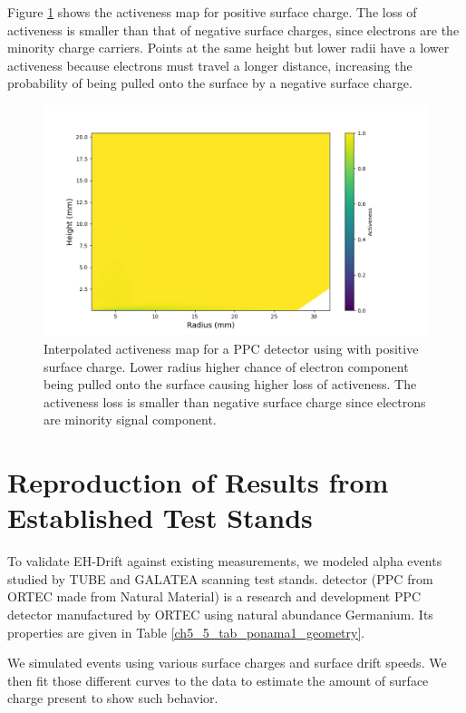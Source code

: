 Figure \ref{ch5_fig_interpolated_activeness_map_pos} shows the activeness map for positive surface charge. The loss of activeness is smaller than that of negative surface charges, since electrons are the minority charge carriers. Points at the same height but lower radii have a lower activeness because electrons must travel a longer distance, increasing the probability of being pulled onto the surface by a negative surface charge.

\begin{figure}%
\centering
\includegraphics[trim={1.5cm 0cm 3.3cm 1cm},clip,width=0.9\linewidth]{ch5/figs/activeness_map_cubic_sc=0.3_ponama_1_5000.png}
\caption{Interpolated activeness map for a PPC detector using \ehd with positive surface charge. Lower radius higher chance of electron component being pulled onto the surface causing higher loss of activeness. The activeness loss is smaller than negative surface charge since electrons are minority signal component.}
\label{ch5_fig_interpolated_activeness_map_pos}
\end{figure}


\section{\label{res:1} Reproduction of Results from Established Test Stands}

To validate EH-Drift against existing measurements, we modeled alpha events studied by TUBE and GALATEA scanning test stands. {\ponama} detector (PPC from ORTEC made from Natural Material) is a research and development PPC detector manufactured by ORTEC using natural abundance Germanium. Its properties are given in Table \ref{ch5_5_tab_ponama1_geometry}.



We simulated events using various surface charges and surface drift speeds.  We then fit those different curves to the data to estimate the amount of surface charge present to show such behavior.


